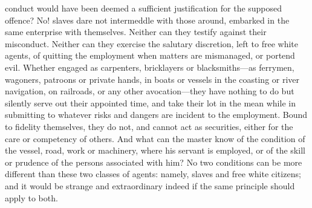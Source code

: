 \documentclass[
  letterpaper,
  11pt,
  DIV=9,
  openright]{scrbook}
\begin{document}
conduct would have been deemed a sufficient justification for the
supposed offence? No! slaves dare not intermeddle with those around,
embarked in the same enterprise with themselves. Neither can they
testify against their misconduct. Neither can they exercise the salutary
discretion, left to free white agents, of quitting the employment when
matters are mismanaged, or portend evil. Whether engaged as carpenters,
bricklayers or blacksmiths---as ferrymen, wagoners, patroons or private
hands, in boats or vessels in the coasting or river navigation, on
railroads, or any other avocation---they have nothing to do but silently
serve out their appointed time, and take their lot in the mean while in
submitting to whatever risks and dangers are incident to the employment.
Bound to fidelity themselves, they do not, and cannot act as securities,
either for the care or competency of others. And what can the master
know of the condition of the vessel, road, work or machinery, where his
servant is employed, or of the skill or prudence of the persons
associated with him? No two conditions can be more different than these
two classes of agents: namely, slaves and free white citizens; and it
would be strange and extraordinary indeed if the same principle should
apply to both.

\end{document}
